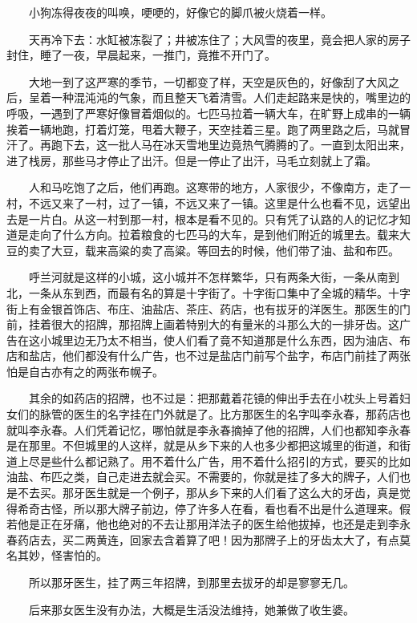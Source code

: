 \documentclass[UTF8]{ctexart}
\begin{document}
　　小狗冻得夜夜的叫唤，哽哽的，好像它的脚爪被火烧着一样。

　　天再冷下去：水缸被冻裂了；井被冻住了；大风雪的夜里，竟会把人家的房子封住，睡了一夜，早晨起来，一推门，竟推不开门了。

　　大地一到了这严寒的季节，一切都变了样，天空是灰色的，好像刮了大风之后，呈着一种混沌沌的气象，而且整天飞着清雪。人们走起路来是快的，嘴里边的呼吸，一遇到了严寒好像冒着烟似的。七匹马拉着一辆大车，在旷野上成串的一辆挨着一辆地跑，打着灯笼，甩着大鞭子，天空挂着三星。跑了两里路之后，马就冒汗了。再跑下去，这一批人马在冰天雪地里边竟热气腾腾的了。一直到太阳出来，进了栈房，那些马才停止了出汗。但是一停止了出汗，马毛立刻就上了霜。

　　人和马吃饱了之后，他们再跑。这寒带的地方，人家很少，不像南方，走了一村，不远又来了一村，过了一镇，不远又来了一镇。这里是什么也看不见，远望出去是一片白。从这一村到那一村，根本是看不见的。只有凭了认路的人的记忆才知道是走向了什么方向。拉着粮食的七匹马的大车，是到他们附近的城里去。载来大豆的卖了大豆，载来高粱的卖了高粱。等回去的时候，他们带了油、盐和布匹。

　　呼兰河就是这样的小城，这小城并不怎样繁华，只有两条大街，一条从南到北，一条从东到西，而最有名的算是十字街了。十字街口集中了全城的精华。十字街上有金银首饰店、布庄、油盐店、茶庄、药店，也有拔牙的洋医生。那医生的门前，挂着很大的招牌，那招牌上画着特别大的有量米的斗那么大的一排牙齿。这广告在这小城里边无乃太不相当，使人们看了竟不知道那是什么东西，因为油店、布店和盐店，他们都没有什么广告，也不过是盐店门前写个盐字，布店门前挂了两张怕是自古亦有之的两张布幌子。

　　其余的如药店的招牌，也不过是：把那戴着花镜的伸出手去在小枕头上号着妇女们的脉管的医生的名字挂在门外就是了。比方那医生的名字叫李永春，那药店也就叫李永春。人们凭着记忆，哪怕就是李永春摘掉了他的招牌，人们也都知李永春是在那里。不但城里的人这样，就是从乡下来的人也多少都把这城里的街道，和街道上尽是些什么都记熟了。用不着什么广告，用不着什么招引的方式，要买的比如油盐、布匹之类，自己走进去就会买。不需要的，你就是挂了多大的牌子，人们也是不去买。那牙医生就是一个例子，那从乡下来的人们看了这么大的牙齿，真是觉得希奇古怪，所以那大牌子前边，停了许多人在看，看也看不出是什么道理来。假若他是正在牙痛，他也绝对的不去让那用洋法子的医生给他拔掉，也还是走到李永春药店去，买二两黄连，回家去含着算了吧！因为那牌子上的牙齿太大了，有点莫名其妙，怪害怕的。

　　所以那牙医生，挂了两三年招牌，到那里去拔牙的却是寥寥无几。

　　后来那女医生没有办法，大概是生活没法维持，她兼做了收生婆。
\end{document}
